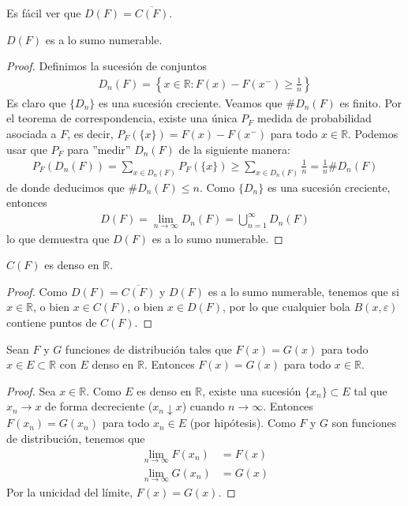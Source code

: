 \begin{obs}
Es fácil ver que $D(F) = \overline{C(F)}$.
\end{obs}

\begin{prop}
    $D(F)$ es a lo sumo numerable.
\end{prop}

\begin{proof}
    Definimos la sucesión de conjuntos
    \begin{align*}
        D_n(F) = \left\{ x \in \mathbb{R} : F(x) - F(x^-) \ge \frac{1}{n} \right\}
    \end{align*}
    Es claro que $\{D_n\}$ es una sucesión creciente. Veamos que $\#D_n(F)$ es finito. Por el teorema de correspondencia, existe una única $P_F$ medida de probabilidad asociada a $F$, es decir, $P_F(\{x\}) = F(x) - F(x^-)$ para todo $x \in \mathbb{R}$. Podemos usar que $P_F$ para ''medir'' $D_n(F)$ de la siguiente manera:
    \begin{align*}
        P_F(D_n(F)) = \sum_{x \in D_n(F)} P_F(\{x\}) \ge \sum_{x \in D_n(F)} \frac{1}{n} = \frac{1}{n} \#D_n(F)
    \end{align*}
    de donde deducimos que $\#D_n(F) \leq n$. Como $\{D_n\}$ es una sucesión creciente, entonces
    \begin{align*}
        D(F) = \lim_{n \to \infty} D_n(F) = \bigcup_{n=1}^{\infty} D_n(F)
    \end{align*}
    lo que demuestra que $D(F)$ es a lo sumo numerable.
\end{proof}

\begin{cor}
    $C(F)$ es denso en $\mathbb{R}$.
\end{cor}

\begin{proof}
    Como $D(F) = \overline{C(F)}$ y $D(F)$ es a lo sumo numerable, tenemos que si $x \in \mathbb{R}$, o bien $x \in C(F)$, o bien $x \in D(F)$, por lo que cualquier bola $B(x,\varepsilon)$ contiene puntos de $C(F)$.
\end{proof}

\begin{prop}
    Sean $F$ y $G$ funciones de distribución tales que $F(x) = G(x)$ para todo $x \in E \subset \mathbb{R}$ con $E$ denso en $\mathbb{R}$. Entonces $F(x) = G(x)$ para todo $x \in \mathbb{R}$.
\end{prop}

\begin{proof}
Sea $x \in \mathbb{R}$. Como $E$ es denso en $\mathbb{R}$, existe una sucesión $\{x_n\} \subset E$ tal que $x_n \to x$ de forma decreciente ($x_n \downarrow x$) cuando $n \to \infty$. Entonces $F(x_n) = G(x_n)$ para todo $x_n \in E$ (por hipótesis). Como $F$ y $G$ son funciones de distribución, tenemos que 
\begin{align*}
    \lim_{n \to \infty} F(x_n) &= F(x) \\
    \lim_{n \to \infty} G(x_n) &= G(x)
\end{align*}
Por la unicidad del límite, $F(x) = G(x)$.
\end{proof}

